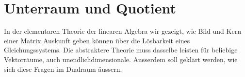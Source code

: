 %
%
%
\chapter{Unterraum und Quotient%
\label{chapter:quotient}}
In der elementaren Theorie der linearen Algebra wir gezeigt, wie 
Bild und Kern einer Matrix Auskunft geben können über die Lösbarkeit
eines Gleichungssystems.
Die abstraktere Theorie muss dasselbe leisten für beliebige Vektorräume,
auch unendlichdimensionale.
Ausserdem soll geklärt werden, wie sich diese Fragen im Dualraum
äussern.





